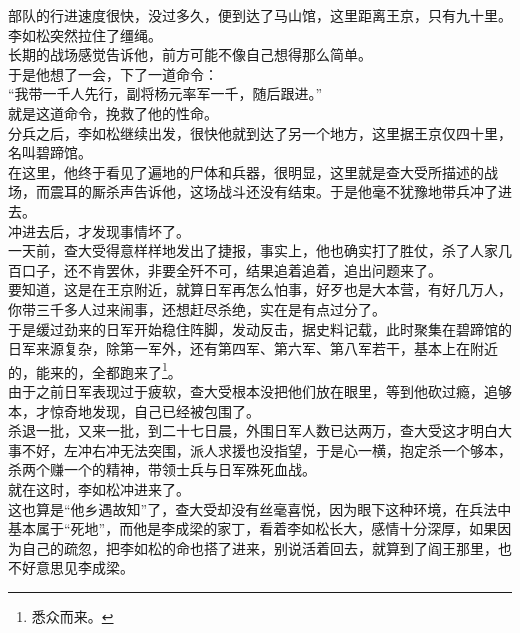 \begin{multicols}{\theparacolNo}
部队的行进速度很快，没过多久，便到达了马山馆，这里距离王京，只有九十里。\\

李如松突然拉住了缰绳。\\

长期的战场感觉告诉他，前方可能不像自己想得那么简单。\\

于是他想了一会，下了一道命令：\\

“我带一千人先行，副将杨元率军一千，随后跟进。”\\

就是这道命令，挽救了他的性命。\\

分兵之后，李如松继续出发，很快他就到达了另一个地方，这里据王京仅四十里，名叫碧蹄馆。\\

在这里，他终于看见了遍地的尸体和兵器，很明显，这里就是查大受所描述的战场，而震耳的厮杀声告诉他，这场战斗还没有结束。于是他毫不犹豫地带兵冲了进去。\\

冲进去后，才发现事情坏了。\\

一天前，查大受得意样样地发出了捷报，事实上，他也确实打了胜仗，杀了人家几百口子，还不肯罢休，非要全歼不可，结果追着追着，追出问题来了。\\

要知道，这是在王京附近，就算日军再怎么怕事，好歹也是大本营，有好几万人，你带三千多人过来闹事，还想赶尽杀绝，实在是有点过分了。\\

于是缓过劲来的日军开始稳住阵脚，发动反击，据史料记载，此时聚集在碧蹄馆的日军来源复杂，除第一军外，还有第四军、第六军、第八军若干，基本上在附近的，能来的，全都跑来了\footnote{悉众而来。}。\\

由于之前日军表现过于疲软，查大受根本没把他们放在眼里，等到他砍过瘾，追够本，才惊奇地发现，自己已经被包围了。\\

杀退一批，又来一批，到二十七日晨，外围日军人数已达两万，查大受这才明白大事不好，左冲右冲无法突围，派人求援也没指望，于是心一横，抱定杀一个够本，杀两个赚一个的精神，带领士兵与日军殊死血战。\\

就在这时，李如松冲进来了。\\

这也算是“他乡遇故知”了，查大受却没有丝毫喜悦，因为眼下这种环境，在兵法中基本属于“死地”，而他是李成梁的家丁，看着李如松长大，感情十分深厚，如果因为自己的疏忽，把李如松的命也搭了进来，别说活着回去，就算到了阎王那里，也不好意思见李成梁。\\


\end{multicols}
